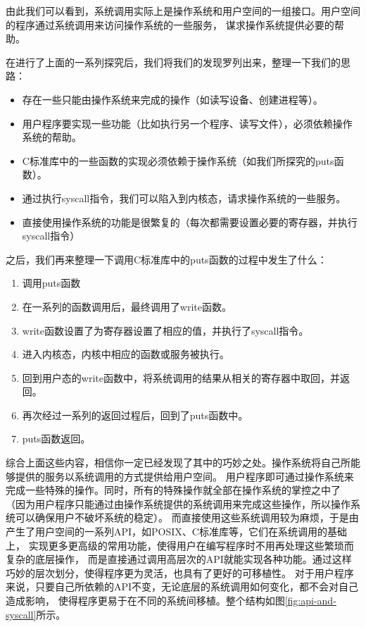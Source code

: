 由此我们可以看到，系统调用实际上是操作系统和用户空间的一组接口。用户空间的程序通过系统调用来访问操作系统的一些服务，
谋求操作系统提供必要的帮助。

在进行了上面的一系列探究后，我们将我们的发现罗列出来，整理一下我们的思路：
\begin{itemize}
  \item 存在一些只能由操作系统来完成的操作（如读写设备、创建进程等）。
  \item 用户程序要实现一些功能（比如执行另一个程序、读写文件），必须依赖操作系统的帮助。
  \item C标准库中的一些函数的实现必须依赖于操作系统（如我们所探究的puts函数）。
  \item 通过执行syscall指令，我们可以陷入到内核态，请求操作系统的一些服务。
  \item 直接使用操作系统的功能是很繁复的（每次都需要设置必要的寄存器，并执行syscall指令）
\end{itemize}

之后，我们再来整理一下调用C标准库中的puts函数的过程中发生了什么：
\begin{enumerate}
  \item 调用puts函数
  \item 在一系列的函数调用后，最终调用了write函数。
  \item write函数设置了为寄存器设置了相应的值，并执行了syscall指令。
  \item 进入内核态，内核中相应的函数或服务被执行。
  \item 回到用户态的write函数中，将系统调用的结果从相关的寄存器中取回，并返回。
  \item 再次经过一系列的返回过程后，回到了puts函数中。
  \item puts函数返回。
\end{enumerate}

综合上面这些内容，相信你一定已经发现了其中的巧妙之处。操作系统将自己所能够提供的服务以系统调用的方式提供给用户空间。
用户程序即可通过操作系统来完成一些特殊的操作。同时，所有的特殊操作就全部在操作系统的掌控之中了
（因为用户程序只能通过由操作系统提供的系统调用来完成这些操作，所以操作系统可以确保用户不破坏系统的稳定）。
而直接使用这些系统调用较为麻烦，于是由产生了用户空间的一系列API，如POSIX、C标准库等，它们在系统调用的基础上，
实现更多更高级的常用功能，使得用户在编写程序时不用再处理这些繁琐而复杂的底层操作，
而是直接通过调用高层次的API就能实现各种功能。通过这样巧妙的层次划分，使得程序更为灵活，也具有了更好的可移植性。
对于用户程序来说，只要自己所依赖的API不变，无论底层的系统调用如何变化，都不会对自己造成影响，
使得程序更易于在不同的系统间移植。整个结构如图\ref{fig:api-and-syscall}所示。

